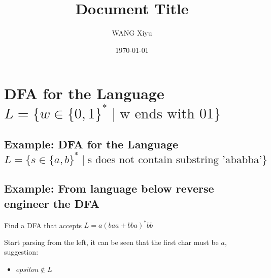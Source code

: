 \documentclass[8pt]{article}
\begin{document}
\pagestyle{fancy}
\fancyhf{}
\fancyhead[L]{\leftmark} %
\fancyhead[R]{\thepage}  %

\title{Document Title}
\author{WANG Xiyu}
\date{\today}
\section*{DFA for the Language \( L = \{ w \in \{0, 1\}^* \mid \textrm{w ends with } 01 \} \)}


\subsection*{Example: DFA for the Language \( L = \{ s \in \{a, b\}^* \mid \textrm{s does not contain substring 'ababba'}  \} \)}

\subsection*{Example: From language below reverse engineer the DFA}

Find a DFA that accepts \(L = a(baa + bba)^*bb \)

Start parsing from the left, it can be seen that the first char must be \(a\), suggestion:
\begin{itemize}
      \item \({epsilon} \notin L\)
\end{itemize}
\end{document}
